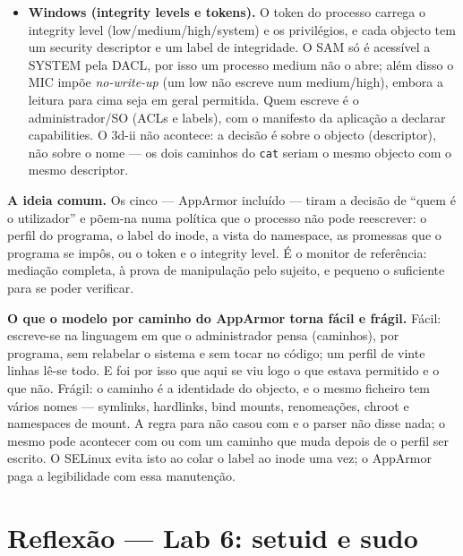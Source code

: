\documentclass[a4paper,11pt]{article}
\newcommand{\cmd}[1]{\textcolor{sscnblue}{\texttt{#1}}}
\newcommand{\file}[1]{\texttt{\detokenize{#1}}}
\begin{document}
\begin{itemize}[leftmargin=1.6em]
  \item \textbf{Windows (integrity levels e tokens).} O token do processo carrega o
  integrity level (low/medium/high/system) e os privil\'egios, e cada objecto tem um
  security descriptor e um label de integridade. O SAM s\'o \'e acess\'ivel a SYSTEM
  pela DACL, por isso um processo medium n\~ao o abre; al\'em disso o MIC imp\~oe
  \emph{no-write-up} (um low n\~ao escreve num medium/high), embora a leitura para cima
  seja em geral permitida. Quem escreve \'e o administrador/SO (ACLs e labels), com o
  manifesto da aplica\c{c}\~ao a declarar capabilities. O 3d-ii n\~ao acontece: a
  decis\~ao \'e sobre o objecto (descriptor), n\~ao sobre o nome --- os dois caminhos do
  \cmd{cat} seriam o mesmo objecto com o mesmo descriptor.
\end{itemize}

\textbf{A ideia comum.} Os cinco --- AppArmor inclu\'ido --- tiram a decis\~ao de
``quem \'e o utilizador'' e p\~oem-na numa pol\'itica que o processo n\~ao pode
reescrever: o perfil do programa, o label do inode, a vista do namespace, as promessas
que o programa se imp\^os, ou o token e o integrity level. \'E o monitor de
refer\^encia: media\c{c}\~ao completa, \`a prova de manipula\c{c}\~ao pelo sujeito, e
pequeno o suficiente para se poder verificar.

\textbf{O que o modelo por caminho do AppArmor torna f\'acil e fr\'agil.} F\'acil:
escreve-se na linguagem em que o administrador pensa (caminhos), por programa, sem
relabelar o sistema e sem tocar no c\'odigo; um perfil de vinte linhas l\^e-se todo. E
foi por isso que aqui se viu logo o que estava permitido e o que n\~ao. Fr\'agil: o
caminho \'e a identidade do objecto, e o mesmo ficheiro tem v\'arios nomes --- symlinks,
hardlinks, bind mounts, renomea\c{c}\~oes, chroot e namespaces de mount. A regra para
\file{/bin/cat} n\~ao casou com \file{/usr/bin/cat} e o parser n\~ao disse nada; o mesmo
pode acontecer com \file{/bin/sh} ou com um caminho que muda depois de o perfil ser
escrito. O SELinux evita isto ao colar o label ao inode uma vez; o AppArmor paga a
legibilidade com essa manuten\c{c}\~ao.

\appendix
\section{Reflex\~ao --- Lab 6: setuid e sudo}
\end{document}

